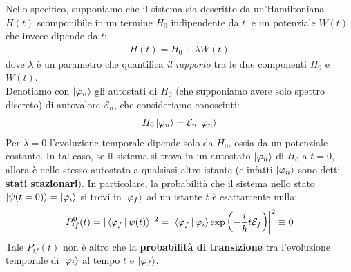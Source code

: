 \documentclass[../../InformazioneQuantistica.tex]{subfiles}
\begin{document}
Nello specifico, supponiamo che il sistema sia descritto da un'Hamiltoniana $H(t)$ scomponibile in un termine $H_0$ indipendente da $t$, e un potenziale $W(t)$ che invece dipende da $t$:
\begin{align*}
    H(t) = H_0 + \lambda W(t)
\end{align*}
dove $\lambda$ è un parametro che quantifica \textit{il rapporto} tra le due componenti $H_0$ e $W(t)$.\\
Denotiamo con $\Ket{\varphi_n}$ gli autostati di $H_0$ (che supponiamo avere solo spettro discreto) di autovalore $\mathcal{E}_n$, che consideriamo conosciuti:
\begin{align*}
    H_0\Ket{\varphi_n} = \mathcal{E}_n \Ket{\varphi_n}
\end{align*}
Per $\lambda = 0$ l'evoluzione temporale dipende solo da $H_0$, ossia da un potenziale costante. In tal caso, se il sistema si trova in un autostato $\Ket{\varphi_n}$ di $H_0$ a $t=0$, allora è nello stesso autostato a qualsiasi altro istante (e infatti $\Ket{\varphi_n}$ sono detti \textbf{stati stazionari}). In particolare, la probabilità che il sistema nello stato $\Ket{\psi(t=0)} = \Ket{\varphi_i}$ si trovi in $\Ket{\varphi_f}$ ad un istante $t$ è esattamente nulla:
\begin{align*}
    P_{if}^0(t) = |\Braket{\varphi_f|\psi(t)}|^2 = \left|\Braket{\varphi_f|\varphi_i} \exp\left(-\frac{i}{\hbar}t \mathcal{E}_f\right) \right|^2 \equiv 0
\end{align*}
Tale $P_{if}(t)$ non è altro che la \textbf{probabilità di transizione} tra l'evoluzione temporale di $\Ket{\varphi_i}$ al tempo $t$ e $\Ket{\varphi_f}$.\\
\end{document}
